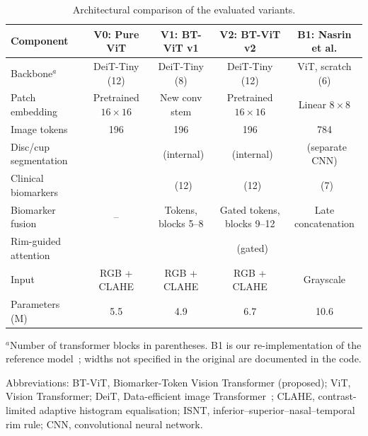 \documentclass[10pt]{article}
\newcommand{\cmark}{\checkmark}
\newcommand{\xmark}{\ding{55}}
\begin{document}
\begin{table}[h]
\centering
\begin{threeparttable}
\caption{Architectural comparison of the evaluated variants.}
\label{tab:variants}
\small
\begin{tabular}{@{}lcccc@{}}
\toprule
Component & V0: Pure ViT & V1: BT-ViT v1 & V2: BT-ViT v2 & B1: Nasrin et al. \\
\midrule
Backbone$^{a}$            & DeiT-Tiny (12)   & DeiT-Tiny (8)    & DeiT-Tiny (12)     & ViT, scratch (6) \\
Patch embedding           & Pretrained $16{\times}16$ & New conv stem & Pretrained $16{\times}16$ & Linear $8{\times}8$ \\
Image tokens              & 196              & 196              & 196                & 784 \\
Disc/cup segmentation     & \xmark           & \cmark\ (internal) & \cmark\ (internal) & \cmark\ (separate CNN) \\
Clinical biomarkers       & \xmark           & \cmark\ (12)     & \cmark\ (12)       & \cmark\ (7) \\
Biomarker fusion          & --               & Tokens, blocks 5--8 & Gated tokens, blocks 9--12 & Late concatenation \\
Rim-guided attention      & \xmark           & \cmark           & \cmark\ (gated)    & \xmark \\
Input                     & RGB + CLAHE      & RGB + CLAHE      & RGB + CLAHE        & Grayscale \\
Parameters (M)            & 5.5              & 4.9              & 6.7                & 10.6 \\
\bottomrule
\end{tabular}
\begin{tablenotes}\footnotesize
\item[] $^{a}$Number of transformer blocks in parentheses. B1 is our re-implementation of the reference
model~\cite{nasrin2026}; widths not specified in the original are documented in the code.
\item[] Abbreviations: BT-ViT, Biomarker-Token Vision Transformer (proposed); ViT, Vision Transformer;
DeiT, Data-efficient image Transformer~\cite{touvron2021}; CLAHE, contrast-limited adaptive histogram
equalisation; ISNT, inferior--superior--nasal--temporal rim rule; CNN, convolutional neural network.
\end{tablenotes}
\end{threeparttable}
\end{table}
\end{document}
